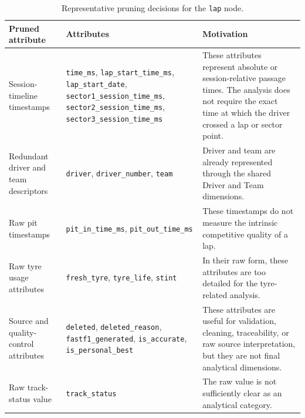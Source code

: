 \documentclass[11pt,a4paper]{article}
\begin{document}
	\begin{table}[H]
		\centering
		\small
		\caption{Representative pruning decisions for the \texttt{lap} node.}
		\label{tab:lap-pruning-representative}
		\renewcommand{\arraystretch}{1.15}
		\begin{tabularx}{\linewidth}{
				>{\raggedright\arraybackslash}p{3.6cm}
				>{\raggedright\arraybackslash}p{4.6cm}
				>{\raggedright\arraybackslash}X
			}
			\toprule
			\textbf{Pruned attribute}
			& \textbf{Attributes}
			& \textbf{Motivation} \\
			\midrule
			
			Session-timeline timestamps
			& \texttt{time\_ms}, \texttt{lap\_start\_time\_ms}, \texttt{lap\_start\_date}, \texttt{sector1\_session\_time\_ms}, \texttt{sector2\_session\_time\_ms}, \texttt{sector3\_session\_time\_ms}
			& These attributes represent absolute or session-relative passage times. The analysis does not require the exact time at which the driver crossed a lap or sector point. \\
			
			
			\midrule
			
			Redundant driver and team descriptors
			& \texttt{driver}, \texttt{driver\_number}, \texttt{team}
			& Driver and team are already represented through the shared Driver and Team dimensions. \\
			
			\midrule
			
			Raw pit timestamps
			& \texttt{pit\_in\_time\_ms}, \texttt{pit\_out\_time\_ms}
			& These timestamps do not measure the intrinsic competitive quality of a lap. \\
			
			\midrule
			
			Raw tyre usage attributes
			& \texttt{fresh\_tyre}, \texttt{tyre\_life}, \texttt{stint}
			& In their raw form, these attributes are too detailed for the tyre-related analysis. \\
			
			\midrule
			
			Source and quality-control attributes
			& \texttt{deleted}, \texttt{deleted\_reason}, \texttt{fastf1\_generated}, \texttt{is\_accurate}, \texttt{is\_personal\_best}
			& These attributes are useful for validation, cleaning, traceability, or raw source interpretation, but they are not final analytical dimensions. \\
	
				
			\midrule
			
			Raw track-status value
			& \texttt{track\_status}
			& The raw value is not sufficiently clear as an analytical category. \\
			
			\bottomrule
		\end{tabularx}
	\end{table}
	
\end{document}
